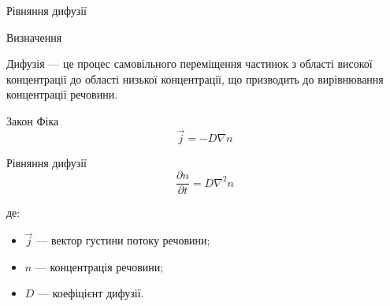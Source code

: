 \documentclass[]{beamer}
\begin{document}
\begin{frame}{Рівняння дифузії}{}
       \begin{block}{Визначення}
\begin{block}{}
    Дифузія --- це процес самовільного переміщення частинок з області високої концентрації до області
    низької концентрації, що призводить до вирівнювання концентрації речовини.
\end{block}
\end{block}

\begin{block}{Закон Фіка}
\begin{equation*}
\vec{j} = -D \nabla n
\end{equation*}
\end{block}

\begin{block}{Рівняння дифузії}
\begin{equation*}
\frac{\partial n}{\partial t} = D \nabla^2 n
\end{equation*}
\end{block}
де:
\begin{itemize}
    \item $\vec{j}$ --- вектор густини потоку речовини;
    \item $n$ --- концентрація речовини;
    \item $D$ --- коефіцієнт дифузії.
\end{itemize}
\end{frame}
\end{document}
